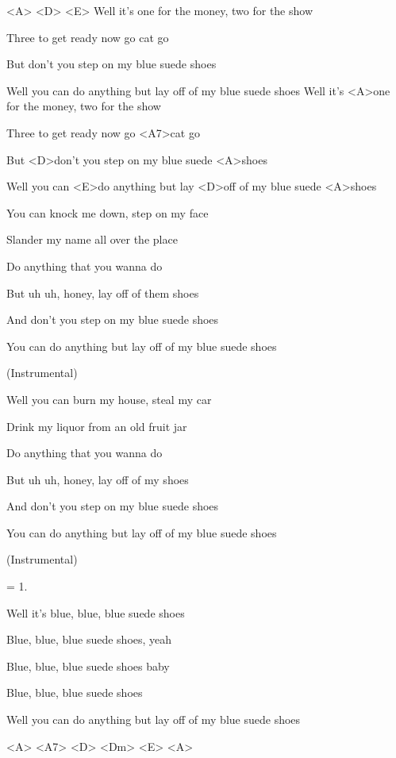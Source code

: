 
\ifdefined\TPBAND
<A> <D> <E>
\zs
Well it's one for the money, two for the show

Three to get ready now go cat go

But don't you step on my blue suede shoes

Well you can do anything but lay off of my blue suede shoes
\ks
\else
\zs
Well it's <A>one for the money, two for the show

Three to get ready now go <A7>cat go

But <D>don't you step on my blue suede <A>shoes

Well you can <E>do anything but lay <D>off of my blue suede <A>shoes
\ks
\fi

\zs
You can knock me down, step on my face

Slander my name all over the place

Do anything that you wanna do

But uh uh, honey, lay off of them shoes

And don't you step on my blue suede shoes

You can do anything but lay off of my blue suede shoes
\ks

\zs
(Instrumental)
\ks

\zs
Well you can burn my house, steal my car

Drink my liquor from an old fruit jar

Do anything that you wanna do

But uh uh, honey, lay off of my shoes

And don't you step on my blue suede shoes

You can do anything but lay off of my blue suede shoes
\ks

\zs
(Instrumental)
\ks

\zs
= 1.
\ks

\zs
Well it's blue, blue, blue suede shoes

Blue, blue, blue suede shoes, yeah

Blue, blue, blue suede shoes baby

Blue, blue, blue suede shoes

Well you can do anything but lay off of my blue suede shoes
\ks

\ifdefined\TPBAND
<A> <A7> <D> <Dm> <E> <A>
\fi

\kp
